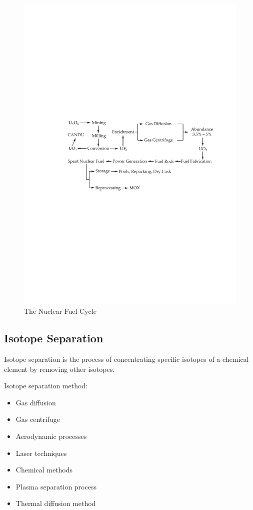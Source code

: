 \begin{figure}[H]
    \centering
    \includegraphics[scale=0.8]{figures/nuclear_fuel_cycle.pdf}
    \caption{The Nuclear Fuel Cycle}
\end{figure}

\subsection{Isotope Separation}

\begin{definition}
    Isotope separation is the process of concentrating specific isotopes of a chemical element by removing other isotopes.
\end{definition}

Isotope separation method:
\begin{itemize}
    \item Gas diffusion
    \item Gas centrifuge
    \item Aerodynamic processes
    \item Laser techniques
    \item Chemical methods
    \item Plasma separation process
    \item Thermal diffusion method
\end{itemize}

